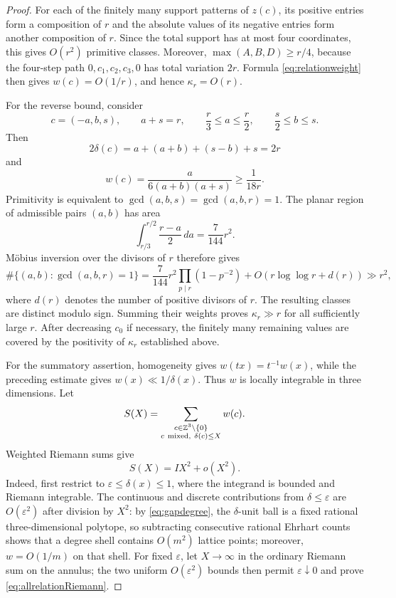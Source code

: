 \documentclass[11pt,reqno]{amsart}
\theoremstyle{definition}
\theoremstyle{remark}
\begin{document}
\begin{proof}
For each of the finitely many support patterns of $z(c)$, its positive
entries form a composition of $r$ and the absolute values of its negative
entries form another composition of $r$.  Since the total support has at
most four coordinates, this gives $O(r^2)$ primitive classes.  Moreover,
$\max(A,B,D)\geq r/4$, because the four-step path
$0,c_1,c_2,c_3,0$ has total variation $2r$.  Formula
\eqref{eq:relationweight} then gives $w(c)=O(1/r)$, and hence
$\kappa_r=O(r)$.

For the reverse bound, consider
\[
 c=(-a,b,s),\qquad a+s=r,\qquad
 \frac r3\leq a\leq\frac r2,\qquad
 \frac s2\leq b\leq s.
\]
Then
\[
 2\delta(c)=a+(a+b)+(s-b)+s=2r
\]
and
\[
 w(c)=\frac{a}{6(a+b)(a+s)}\geq\frac1{18r}.
\]
Primitivity is equivalent to
$\gcd(a,b,s)=\gcd(a,b,r)=1$.  The planar region of admissible pairs
$(a,b)$ has area
\[
 \int_{r/3}^{r/2}\frac{r-a}{2}\,da=\frac7{144}r^2.
\]
M\"obius inversion over the divisors of $r$ therefore gives
\[
 \#\{(a,b):\gcd(a,b,r)=1\}
 =\frac7{144}r^2\prod_{p\mid r}(1-p^{-2})
 +O(r\log\log r+d(r))\gg r^2,
\]
where $d(r)$ denotes the number of positive divisors of $r$.
 The resulting classes are distinct modulo sign.  Summing their weights
 proves $\kappa_r\gg r$ for all sufficiently large $r$.  After decreasing
 $c_0$ if necessary, the finitely many remaining values are covered by the
 positivity of $\kappa_r$ established above.

For the summatory assertion, homogeneity gives
$w(tx)=t^{-1}w(x)$, while the preceding estimate gives
$w(x)\ll1/\delta(x)$.  Thus $w$ is locally integrable in three
dimensions.  Let
\[
 S(X)=\sum_{\substack{c\in\mathbb Z^3\setminus\{0\}\\
                       c\ {\rm mixed},\ \delta(c)\leq X}}w(c).
\]
Weighted Riemann sums give
\begin{equation}\label{eq:allrelationRiemann}
 S(X)=IX^2+o(X^2).
\end{equation}
Indeed, first restrict to $\varepsilon\leq\delta(x)\leq1$, where the
integrand is bounded and Riemann integrable.  The continuous and discrete
contributions from $\delta\leq\varepsilon$ are $O(\varepsilon^2)$ after
division by $X^2$: by \eqref{eq:gapdegree}, the $\delta$-unit ball is a
fixed rational three-dimensional polytope, so subtracting consecutive
rational Ehrhart counts shows that a degree shell contains $O(m^2)$ lattice
points; moreover, $w=O(1/m)$ on that shell.
For fixed $\varepsilon$, let $X\to\infty$ in the ordinary Riemann sum on
the annulus; the two uniform $O(\varepsilon^2)$ bounds then permit
$\varepsilon\downarrow0$ and prove \eqref{eq:allrelationRiemann}.


\end{proof}
\end{document}
